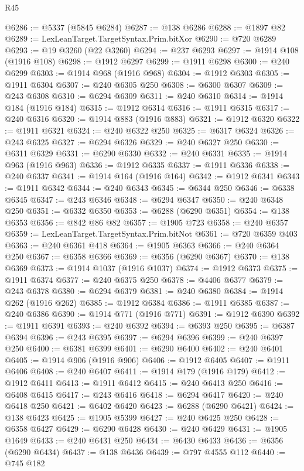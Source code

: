 \begin{lexlean}{R45}
\begin{coremodule}
{@6286 := @5337 (@5845 @6284)
@6287 := @138 @6286
@6288 := @1897 @82
@6289 := LexLeanTarget.TargetSyntax.Prim.bitXor
@6290 := @720 @6289
@6293 := @19 @3260 (@22 @3260)
@6294 := @237 @6293
@6297 := @1914 @108 (@1916 @108)
@6298 := @1912 @6297
@6299 := @1911 @6298
@6300 := @240 @6299
@6303 := @1914 @968 (@1916 @968)
@6304 := @1912 @6303
@6305 := @1911 @6304
@6307 := @240 @6305 @250
@6308 := @6300 @6307
@6309 := @243 @6308
@6310 := @6294 @6309
@6311 := @240 @6310
@6314 := @1914 @184 (@1916 @184)
@6315 := @1912 @6314
@6316 := @1911 @6315
@6317 := @240 @6316
@6320 := @1914 @883 (@1916 @883)
@6321 := @1912 @6320
@6322 := @1911 @6321
@6324 := @240 @6322 @250
@6325 := @6317 @6324
@6326 := @243 @6325
@6327 := @6294 @6326
@6329 := @240 @6327 @250
@6330 := @6311 @6329
@6331 := @6290 @6330
@6332 := @240 @6331
@6335 := @1914 @963 (@1916 @963)
@6336 := @1912 @6335
@6337 := @1911 @6336
@6338 := @240 @6337
@6341 := @1914 @164 (@1916 @164)
@6342 := @1912 @6341
@6343 := @1911 @6342
@6344 := @240 @6343
@6345 := @6344 @250
@6346 := @6338 @6345
@6347 := @243 @6346
@6348 := @6294 @6347
@6350 := @240 @6348 @250
@6351 := @6332 @6350
@6353 := @6288 (@6290 @6351)
@6354 := @138 @6353
@6356 := @842 @86 @82
@6357 := @1905 @723
@6358 := @240 @6357
@6359 := LexLeanTarget.TargetSyntax.Prim.bitNot
@6361 := @720 @6359 @403
@6363 := @240 @6361 @418
@6364 := @1905 @6363
@6366 := @240 @6364 @250
@6367 := @6358 @6366
@6369 := @6356 (@6290 @6367)
@6370 := @138 @6369
@6373 := @1914 @1037 (@1916 @1037)
@6374 := @1912 @6373
@6375 := @1911 @6374
@6377 := @240 @6375 @250
@6378 := @4406 @6377
@6379 := @243 @6378
@6380 := @6294 @6379
@6381 := @240 @6380
@6384 := @1914 @262 (@1916 @262)
@6385 := @1912 @6384
@6386 := @1911 @6385
@6387 := @240 @6386
@6390 := @1914 @771 (@1916 @771)
@6391 := @1912 @6390
@6392 := @1911 @6391
@6393 := @240 @6392
@6394 := @6393 @250
@6395 := @6387 @6394
@6396 := @243 @6395
@6397 := @6294 @6396
@6399 := @240 @6397 @250
@6400 := @6381 @6399
@6401 := @6290 @6400
@6402 := @240 @6401
@6405 := @1914 @906 (@1916 @906)
@6406 := @1912 @6405
@6407 := @1911 @6406
@6408 := @240 @6407
@6411 := @1914 @179 (@1916 @179)
@6412 := @1912 @6411
@6413 := @1911 @6412
@6415 := @240 @6413 @250
@6416 := @6408 @6415
@6417 := @243 @6416
@6418 := @6294 @6417
@6420 := @240 @6418 @250
@6421 := @6402 @6420
@6423 := @6288 (@6290 @6421)
@6424 := @138 @6423
@6425 := @1905 @5399
@6427 := @240 @6425 @250
@6428 := @6358 @6427
@6429 := @6290 @6428
@6430 := @240 @6429
@6431 := @1905 @1649
@6433 := @240 @6431 @250
@6434 := @6430 @6433
@6436 := @6356 (@6290 @6434)
@6437 := @138 @6436
@6439 := @797 @4555 @112
@6440 := @745 @182
}
\end{coremodule}
\end{lexlean}
